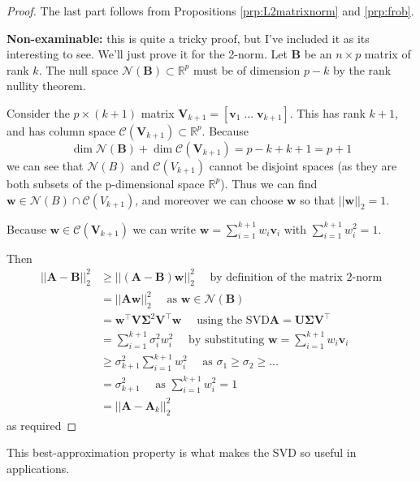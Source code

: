 \documentclass[]{book}
\theoremstyle{definition}
\theoremstyle{definition}
\theoremstyle{definition}
\theoremstyle{remark}
\begin{document}
\begin{proof}
{}The last part follows from Propositions \ref{prp:L2matrixnorm} and \ref{prp:frob}.

\textbf{Non-examinable:} this is quite a tricky proof, but I've included it as its interesting to see.
We'll just prove it for the 2-norm.
Let \(\mathbf B\) be an \(n\times p\) matrix of rank \(k\). The null space \(\mathcal{N}(\mathbf B)\subset\mathbb{R}^p\) must be of dimension \(p-k\) by the rank nullity theorem.

Consider the \(p \times (k+1)\) matrix \(\mathbf V_{k+1}=[\mathbf v_1\; \ldots \;\mathbf v_{k+1}]\). This has rank \(k+1\), and has column space \(\mathcal{C}(\mathbf V_{k+1})\subset \mathbb{R}^{p}\). Because
\[\dim \mathcal{N}(\mathbf B)+\dim \mathcal{C}(\mathbf V_{k+1})=p-k+k+1=p+1\]
we can see that \(\mathcal{N}(B)\) and \(\mathcal{C}(V_{k+1})\) cannot be disjoint spaces (as they are both subsets of the p-dimensional space \(\mathbb{R}^p\)). Thus we can find
\(\mathbf w\in \mathcal{N}(B)\cap\mathcal{C}(V_{k+1})\), and moreover we can choose \(\mathbf w\) so that \(||\mathbf w||_2=1\).

Because \(\mathbf w\in \mathcal{C}(\mathbf V_{k+1})\) we can write \(\mathbf w= \sum_{i=1}^{k+1}w_i \mathbf v_i\) with \(\sum_{i=1}^{k+1}w_i^2=1\).

Then
\begin{align*}
||\mathbf A-\mathbf B||_2^2 &\geq ||(\mathbf A-\mathbf B)\mathbf w||_{2}^2 \quad \mbox{ by definition of the matrix 2-norm}\\
&=||\mathbf A\mathbf w||_2^2 \quad \mbox{ as } \mathbf w\in \mathcal{N}(\mathbf B)\\
&=\mathbf w^\top \mathbf V\boldsymbol{\Sigma}^2\mathbf V^\top \mathbf w\quad\mbox{ using the SVD} \mathbf A=\mathbf U\boldsymbol{\Sigma}\mathbf V^\top\\
&=\sum_{i=1}^{k+1}\sigma_i^2 w_i^2 \quad\mbox{ by substituting }\mathbf w= \sum_{i=1}^{k+1}w_i \mathbf v_i\\
&\geq \sigma_{k+1}^2 \sum_{i=1}^{k+1} w_i^2\quad\mbox{ as } \sigma_1\geq\sigma_2\geq\ldots\\
&= \sigma_{k+1}^2 \quad\mbox{ as } \sum_{i=1}^{k+1}w_i^2=1\\
&=||\mathbf A-\mathbf A_k||_2^2
\end{align*}
as required
\end{proof}

This best-approximation property is what makes the SVD so useful in applications.
\end{document}
